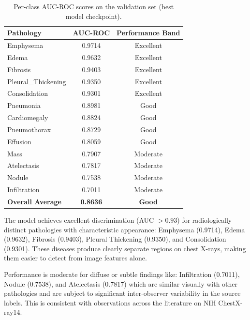 \begin{table}[ht]
\centering
\caption{Per-class AUC-ROC scores on the validation set (best model checkpoint).}
\label{tab:per_class_auc}
\renewcommand{\arraystretch}{1.3}
\begin{tabular}{lcc}
\toprule
\textbf{Pathology} & \textbf{AUC-ROC} & \textbf{Performance Band} \\
\midrule
Emphysema          & 0.9714 & \cellcolor{green!20}Excellent \\
Edema              & 0.9632 & \cellcolor{green!20}Excellent \\
Fibrosis           & 0.9403 & \cellcolor{green!20}Excellent \\
Pleural\_Thickening & 0.9350 & \cellcolor{green!20}Excellent \\
Consolidation      & 0.9301 & \cellcolor{green!20}Excellent \\
Pneumonia          & 0.8981 & \cellcolor{yellow!30}Good \\
Cardiomegaly       & 0.8824 & \cellcolor{yellow!30}Good \\
Pneumothorax       & 0.8729 & \cellcolor{yellow!30}Good \\
Effusion           & 0.8059 & \cellcolor{yellow!30}Good \\
Mass               & 0.7907 & \cellcolor{orange!20}Moderate \\
Atelectasis        & 0.7817 & \cellcolor{orange!20}Moderate \\
Nodule             & 0.7538 & \cellcolor{orange!20}Moderate \\
Infiltration       & 0.7011 & \cellcolor{orange!20}Moderate \\
\midrule
\textbf{Overall Average} & \textbf{0.8636} & \textbf{Good} \\
\bottomrule
\end{tabular}
\end{table}

The model achieves excellent discrimination (AUC $> 0.93$) for radiologically distinct pathologies with characteristic appearance: Emphysema (0.9714), Edema (0.9632), Fibrosis (0.9403), Pleural Thickening (0.9350), and Consolidation (0.9301). These diseases produce clearly separate regions on chest X-rays, making them easier to detect from image features alone.

Performance is moderate for diffuse or subtle findings like: Infiltration (0.7011), Nodule (0.7538), and Atelectasis (0.7817) which are similar visually with other pathologies and are subject to significant inter-observer variability in the source labels. This is consistent with observations across the literature on NIH ChestX-ray14.

